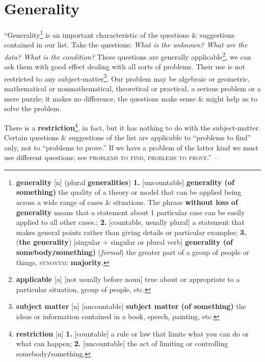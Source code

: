 \documentclass[oneside]{book}
\numberwithin{equation}{section}
\begin{document}
\section{Generality}
``Generality\footnote{\textbf{generality} [n] (plural \textbf{generalities}) \textbf{1.} [uncountable] \textbf{generality (of something)} the quality of a theory or model that can be applied being across a wide range of cases \& situations. The phrase \textbf{without loss of generality} means that a statement about 1 particular case can be easily applied to all other cases.; \textbf{2.} [countable, usually plural] a statement that makes general points rather than giving details or particular examples; \textbf{3.} (\textbf{the generality}) [singular $+$ singular or plural verb] \textbf{generality (of somebody\texttt{/}something)} (\textit{formal}) the greater part of a group of people or things, \textsc{synonym}: \textbf{majority}.} is an important characteristic of the questions \& suggestions contained in our list. Take the questions: \textit{What is the unknown? What are the data? What is the condition?} These questions are generally applicable\footnote{\textbf{applicable} [a] [not usually before noun] true about or appropriate to a particular situation, group of people, etc.}, we can ask them with good effect dealing with all sorts of problems. Their use is not restricted to any subject-matter\footnote{\textbf{subject matter} [n] [uncountable] \textbf{subject matter (of something)} the ideas or information contained in a book, speech, painting, etc.}. Our problem may be algebraic or geometric, mathematical or nonmathematical, theoretical or practical, a serious problem or a mere puzzle; it makes no difference, the questions make sense \& might help us to solve the problem.

There is a \textbf{restriction}\footnote{\textbf{restriction} [n] \textbf{1.} [countable] a rule or law that limits what you can do or what can happen; \textbf{2.} [uncountable] the act of limiting or controlling somebody\texttt{/}something.}, in fact, but it has nothing to do with the subject-matter. Certain questions \& suggestions of the list are applicable to ``problems to find'' only, not to ``problems to prove.'' If we have a problem of the latter kind we must use different questions; see \textsc{problems to find, problems to prove}.'' -- \cite[pp. 2--3]{Polya2014}
\end{document}
